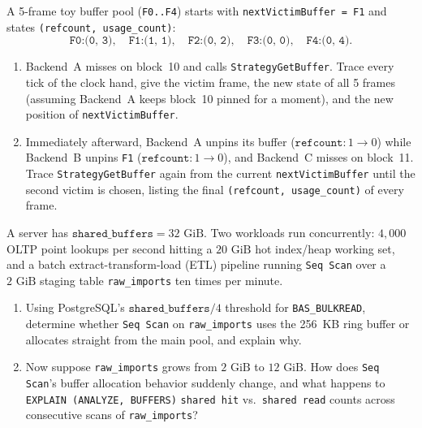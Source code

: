 \begin{exercise}
\label{ex:ch02-clock-sim}
A 5-frame toy buffer pool (\texttt{F0..F4}) starts with \texttt{nextVictimBuffer = F1} and states \texttt{(refcount, usage\_count)}:
\[
  \texttt{F0:(0, 3)}, \quad \texttt{F1:(1, 1)}, \quad \texttt{F2:(0, 2)}, \quad \texttt{F3:(0, 0)}, \quad \texttt{F4:(0, 4)}.
\]
\begin{enumerate}[label=(\alph*)]
  \item Backend~A misses on block~10 and calls \texttt{StrategyGetBuffer}. Trace every tick of the clock hand, give the victim frame, the new state of all 5 frames (assuming Backend~A keeps block~10 pinned for a moment), and the new position of \texttt{nextVictimBuffer}.
  \item Immediately afterward, Backend~A unpins its buffer ($\texttt{refcount}: 1 \to 0$) while Backend~B unpins \texttt{F1} ($\texttt{refcount}: 1 \to 0$), and Backend~C misses on block~11. Trace \texttt{StrategyGetBuffer} again from the current \texttt{nextVictimBuffer} until the second victim is chosen, listing the final \texttt{(refcount, usage\_count)} of every frame.
\end{enumerate}
\end{exercise}

\begin{exercise}
\label{ex:ch02-ring-calc}
A server has $\texttt{shared\_buffers} = 32\text{ GiB}$. Two workloads run concurrently: $4{,}000$ OLTP point lookups per second hitting a $20\text{ GiB}$ hot index/heap working set, and a batch extract-transform-load (ETL) pipeline running \texttt{Seq Scan} over a $2\text{ GiB}$ staging table \texttt{raw\_imports} ten times per minute.
\begin{enumerate}[label=(\alph*)]
  \item Using PostgreSQL's $\texttt{shared\_buffers} / 4$ threshold for \texttt{BAS\_BULKREAD}, determine whether \texttt{Seq Scan} on \texttt{raw\_imports} uses the 256~KB ring buffer or allocates straight from the main pool, and explain why.
  \item Now suppose \texttt{raw\_imports} grows from $2\text{ GiB}$ to $12\text{ GiB}$. How does \texttt{Seq Scan}'s buffer allocation behavior suddenly change, and what happens to \texttt{EXPLAIN (ANALYZE, BUFFERS)} \texttt{shared hit} vs.\ \texttt{shared read} counts across consecutive scans of \texttt{raw\_imports}?
\end{enumerate}
\end{exercise}

\chapterline

